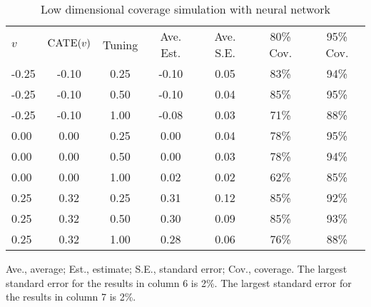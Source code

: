 \begin{table}[H]
\centering
  \begin{threeparttable}
    \caption{Low dimensional coverage simulation with neural network}
     \begin{tabular}{lcccccc}
       $v$& $\textsc{CATE}(v)$ & Tuning &  Ave. Est. & Ave. S.E. &  80\% Cov. & 95\% Cov. \\[5pt]
-0.25 & -0.10 & 0.25 & -0.10 & 0.05 &  83\% & 94\% \\
-0.25 & -0.10 & 0.50 & -0.10 & 0.04  & 85\% & 95\% \\
-0.25 & -0.10 & 1.00 & -0.08 & 0.03  & 71\% & 88\% \\
0.00 & 0.00 & 0.25 & 0.00 & 0.04 &  78\% & 95\% \\
0.00 & 0.00 & 0.50 & 0.00 & 0.03  & 78\% & 94\% \\
0.00 & 0.00 & 1.00 & 0.02 & 0.02  & 62\% & 85\% \\
0.25 & 0.32 & 0.25 & 0.31 & 0.12 &  85\% & 92\% \\
0.25 & 0.32 & 0.50 & 0.30 & 0.09  & 85\% & 93\% \\
0.25 & 0.32 & 1.00 & 0.28 & 0.06  & 76\% & 88\% 
     \end{tabular}
     \label{tab:nn_low}
    \begin{tablenotes}
      \small
      \item Ave., average; Est., estimate; S.E., standard error; Cov., coverage. The largest standard error for the results in column 6 is 2\%. The largest standard error for the results in column 7 is 2\%.
    \end{tablenotes}
  \end{threeparttable}
\end{table}



